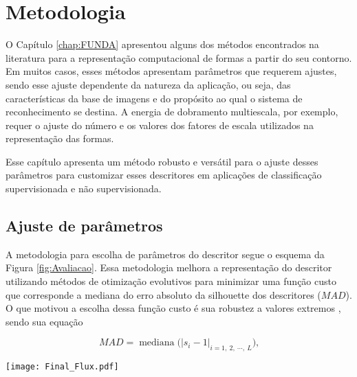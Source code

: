 \chapter{Metodologia}
\label{chap:MatMet}

O Capítulo \ref{chap:FUNDA} apresentou alguns dos métodos encontrados na literatura para a representação computacional de formas a partir do seu contorno.  Em muitos casos, esses métodos apresentam parâmetros que requerem ajustes, sendo esse ajuste dependente da natureza da aplicação, ou seja,  das características da base de imagens e do propósito ao qual o sistema de reconhecimento se destina. A energia de dobramento multiescala, por exemplo, requer o ajuste do número e os valores dos fatores de escala utilizados na representação das formas. 

Esse capítulo apresenta um método robusto e versátil para o ajuste desses parâmetros para customizar esses descritores em aplicações de classificação supervisionada e não supervisionada.   
 

 

\section{Ajuste de parâmetros}
A metodologia para escolha de parâmetros do descritor segue o esquema da Figura \ref{fig:Avaliacao}. Essa metodologia melhora a representação do descritor utilizando métodos de otimização evolutivos para minimizar uma função custo que corresponde a mediana do erro absoluto da silhouette dos descritores ($MAD$). O que motivou a escolha dessa função custo é sua robustez a valores extremos \cite{Rousseeuw:1987:2}, sendo sua equação 

\begin{equation}
\label{eq:mad}
MAD = \operatorname{mediana}\big(|s_i - 1|_{i =1,\:2,\:\cdots,\:L}\big)\text{,}
\end{equation}

\begin{figure*}[ht]
\centering
\texttt{[image: Final\_Flux.pdf]}
\caption{Proposta de uma metodologia para otimização evolucionária de um descritor multiescala de forma.} 
\label{fig:Avaliacao}
\end{figure*}

